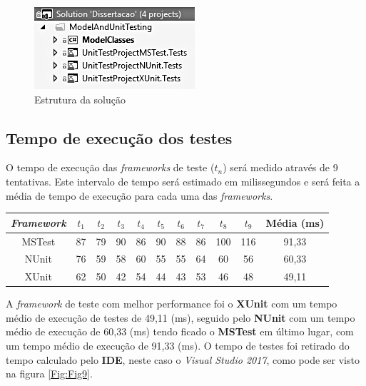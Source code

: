 \begin{figure}[hbt!]
\centering
\includegraphics[width=0.35\linewidth]{Cap5/SolutionStructure.png}
\caption{Estrutura da solução}
\label{Fig:Fig8}
\end{figure}

\subsection{Tempo de execução dos testes}

\hspace{1cm}O tempo de execução das \textit{frameworks} de teste ($t_{n}$) será medido através de 9 tentativas. Este intervalo de tempo será estimado em milissegundos e será feita a média de tempo de execução para cada uma das \textit{frameworks}.

\begin{center}
 \begin{tabular}{||c | c | c | c | c | c | c | c | c | c | c ||} 
 \hline
 \textit{Framework} & \textit{$t_{1}$} & \textit{$t_{2}$} & \textit{$t_{3}$} & \textit{$t_{4}$} & \textit{$t_{5}$} & \textit{$t_{6}$} & \textit{$t_{7}$} & \textit{$t_{8}$} & \textit{$t_{9}$} & Média (ms)\\ [0.5ex] 
 \hline\hline
 MSTest & 87 & 79 & 90 & 86 & 90 & 88 & 86 & 100 & 116 & 91,33\\ 
 \hline
 NUnit & 76 & 59 & 58 & 60 & 55 & 55 & 64 & 60 & 56 & 60,33\\
 \hline
 XUnit & 62 & 50 & 42 & 54 & 44 & 43 & 53 & 46 & 48 & 49,11\\ [1ex] 
 \hline
\end{tabular}
\end{center}

\hspace{1cm}A \textit{framework} de teste com melhor performance foi o \textbf{XUnit} com um tempo médio de execução de testes de 49,11 (ms), seguido pelo \textbf{NUnit} com um tempo médio de execução de 60,33 (ms) tendo ficado o \textbf{MSTest} em último lugar, com um tempo médio de execução de 91,33 (ms). O tempo de testes foi retirado do tempo calculado pelo \textbf{IDE}, neste caso o \textit{Visual Studio 2017}, como pode ser visto na figura \ref{Fig:Fig9}.

